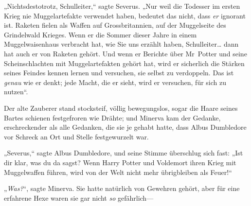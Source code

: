 „Nichtsdestotrotz, Schulleiter,“ sagte Severus. „Nur weil die Todesser im ersten Krieg nie Muggelartefakte verwendet haben, bedeutet das nicht, dass \emph{er} ignorant ist. Raketen fielen als Waffen auf Grossbritannien, auf der Muggelseite des Grindelwald Krieges. Wenn er die Sommer dieser Jahre in einem Muggelwaisenhaus verbracht hat, wie Sie uns erzählt haben, Schulleiter… dann hat auch er von Raketen gehört. Und wenn er Berichte über Mr~Potter und seine Scheinschlachten mit Muggelartefakten gehört hat, wird er sicherlich die Stärken seines Feindes kennen lernen und versuchen, sie selbst zu verdoppeln. Das ist \emph{genau} wie er denkt; jede Macht, die er sieht, wird er versuchen, für sich zu nutzen“.

Der alte Zauberer stand stocksteif, völlig bewegungslos, sogar die Haare seines Bartes schienen festgefroren wie Drähte; und Minerva kam der Gedanke, erschreckender als alle Gedanken, die sie je gehabt hatte, dass Albus Dumbledore vor Schreck an Ort und Stelle festgewurzelt war.

„Severus,“ sagte Albus Dumbledore, und seine Stimme überschlug sich fast: „Ist dir klar, was du da sagst? Wenn Harry Potter und Voldemort ihren Krieg mit Muggelwaffen führen, wird von der Welt nicht mehr übrigbleiben als Feuer!“

„\emph{Was?}“, sagte Minerva. Sie hatte natürlich von Gewehren gehört, aber für eine erfahrene Hexe waren sie gar nicht \emph{so} gefährlich—


